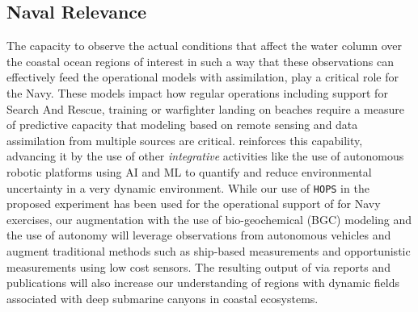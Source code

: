 \subsection{Naval Relevance}
\label{sec:naval}

The capacity to observe the actual conditions that affect the water
column over the coastal ocean regions of interest in such a way that
these observations can effectively feed the operational models with
assimilation, play a critical role for the Navy. These models impact how
regular operations including support for Search And Rescue, training or
warfighter landing on beaches require a measure of predictive capacity
that modeling based on remote sensing and data assimilation from
multiple sources are critical. \proj reinforces this capability,
advancing it by the use of other \emph{integrative} activities like the
use of autonomous robotic platforms using AI and ML to quantify and
reduce environmental uncertainty in a very dynamic environment. While
our use of \texttt{HOPS} in the proposed experiment has been used for
the operational support of for Navy exercises, our augmentation with the
use of bio-geochemical (BGC) modeling and the use of autonomy will
leverage observations from autonomous vehicles and augment traditional
methods such as ship-based measurements and opportunistic measurements
using low cost sensors. The resulting output of \proj via reports and
publications will also increase our understanding of regions with
dynamic fields associated with deep submarine canyons in coastal
ecosystems. 


